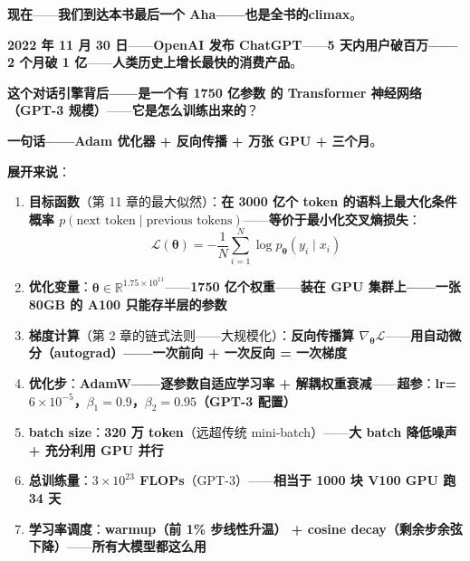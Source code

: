 \textbf{现在}——\textbf{我们到达本书最后一个 Aha——也是全书的\textbf{climax}}。

\begin{tcolorbox}[ahabox={\Large Aha：ChatGPT 训练 —— 优化理论 70 年的总和成就}]
\textbf{2022 年 11 月 30 日}——\textbf{OpenAI 发布 ChatGPT}——\textbf{5 天内用户破百万——2 个月破 1 亿}——\textbf{人类历史上增长最快的消费产品}。

\medskip

\textbf{这个对话引擎背后——是一个有 \textbf{1750 亿参数} 的 Transformer 神经网络（GPT-3 规模）}——\textbf{它是怎么训练出来的}？

\medskip

\textbf{一句话——\textbf{Adam 优化器 + 反向传播 + 万张 GPU + 三个月}}。

\medskip

\textbf{展开来说}：

\begin{enumerate}
\item \textbf{目标函数}（第 11 章的最大似然）：\textbf{在 3000 亿个 token 的语料上最大化条件概率 $p(\text{next token} \mid \text{previous tokens})$}——\textbf{等价于最小化\textbf{交叉熵损失}}：
\[
\mathcal{L}(\bm \theta) = -\frac{1}{N} \sum_{i=1}^N \log p_{\bm \theta}(y_i \mid x_i)
\]

\item \textbf{优化变量}：\textbf{$\bm \theta \in \mathbb{R}^{1.75 \times 10^{11}}$}——\textbf{1750 亿个权重}——\textbf{装在 \textbf{GPU 集群}上——一张 80GB 的 A100 只能存\textbf{半层}的参数}

\item \textbf{梯度计算}（第 2 章的链式法则——大规模化）：\textbf{反向传播算 $\nabla_{\bm \theta} \mathcal{L}$}——\textbf{用\textbf{自动微分}（autograd）——一次前向 + 一次反向 = 一次梯度}

\item \textbf{优化步}：\textbf{AdamW——逐参数自适应学习率 + 解耦权重衰减}——\textbf{超参}：\textbf{lr=$6\times 10^{-5}$，$\beta_1=0.9$，$\beta_2=0.95$（GPT-3 配置）}

\item \textbf{batch size}：\textbf{320 万 token}（远超传统 mini-batch）——\textbf{大 batch 降低噪声 + 充分利用 GPU 并行}

\item \textbf{总训练量}：\textbf{$3 \times 10^{23}$ FLOPs}（GPT-3）——\textbf{相当于 1000 块 V100 GPU 跑\textbf{34 天}}

\item \textbf{学习率调度}：\textbf{warmup（前 1\% 步线性升温） + cosine decay（剩余步余弦下降）}——\textbf{所有大模型都这么用}


\end{enumerate}
\end{tcolorbox}
